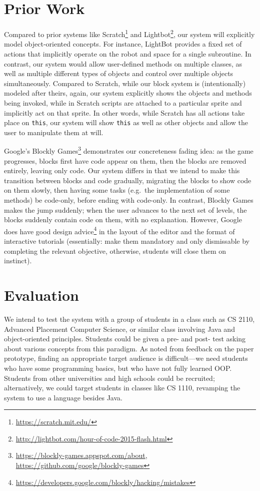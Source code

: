 \documentclass[12pt,notitlepage]{article}
\begin{document}
\section{Prior Work}

Compared to prior systems like
Scratch\footnote{\url{https://scratch.mit.edu/}} and
Lightbot\footnote{\url{http://lightbot.com/hour-of-code-2015-flash.html}},
our system will explicitly model object-oriented concepts. For
instance, LightBot provides a fixed set of actions that implicitly
operate on the robot and space for a single subroutine. In contrast,
our system would allow user-defined methods on multiple classes, as
well as multiple different types of objects and control over multiple
objects simultaneously. Compared to Scratch, while our block system is
(intentionally) modeled after theirs, again, our system explicitly
shows the objects and methods being invoked, while in Scratch scripts
are attached to a particular sprite and implicitly act on that
sprite. In other words, while Scratch has all actions take place on
\texttt{this}, our system will show \texttt{this} as well as other
objects and allow the user to manipulate them at will.

Google's Blockly
Games\footnote{\url{https://blockly-games.appspot.com/about},
  \url{https://github.com/google/blockly-games}} demonstrates our
concreteness fading idea: as the game progresses, blocks first have
code appear on them, then the blocks are removed entirely, leaving
only code. Our system differs in that we intend to make this
transition between blocks and code gradually, migrating the blocks to
show code on them slowly, then having some tasks (e.g.\ the
implementation of some methods) be code-only, before ending with
code-only. In contrast, Blockly Games makes the jump suddenly; when
the user advances to the next set of levels, the blocks suddenly
contain code on them, with no explanation. However, Google does have
good design
advice\footnote{\url{https://developers.google.com/blockly/hacking/mistakes}}
in the layout of the editor and the format of interactive tutorials
(essentially: make them mandatory and only dismissable by completing
the relevant objective, otherwise, students will close them on
instinct).

\section{Evaluation}

We intend to test the system with a group of students in a class such
as CS 2110, Advanced Placement Computer Science, or similar class
involving Java and object-oriented principles. Students could be given
a pre- and post- test asking about various concepts from this
paradigm. As noted from feedback on the paper prototype, finding an
appropriate target audience is difficult---we need students who have
some programming basics, but who have not fully learned OOP.\@
Students from other universities and high schools could be recruited;
alternatively, we could target students in classes like CS 1110,
revamping the system to use a language besides Java.
\end{document}
